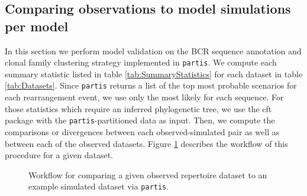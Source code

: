 \documentclass{article}
\begin{document}
\subsection*{Comparing observations to model simulations per model}
In this section we perform model validation on the BCR sequence annotation and clonal family clustering strategy implemented in \texttt{partis}\cite{Ralph2016-nw, Ralph2016-iz}.
We compute each summary statistic listed in table \ref{tab:SummaryStatistics} for each dataset in table \ref{tab:Datasets}.
Since \texttt{partis} returns a list of the top most probable scenarios for each rearrangement event, we use only the most likely for each sequence.
For those statistics which require an inferred phylogenetic tree, we use the cft package with the \texttt{partis}-partitioned data as input.
Then, we compute the comparisons or divergences between each observed-simulated pair as well as between each of the observed datasets.
Figure \ref{PartisWorkflow} describes the workflow of this procedure for a given dataset.
\begin{figure}
\begin{adjustbox}{max totalsize={\textwidth}{.5\textheight},center}
\end{adjustbox}
\caption{Workflow for comparing a given observed repertoire dataset to an example simulated dataset via \texttt{partis}.}
\label{PartisWorkflow}
\end{figure}
\end{document}
